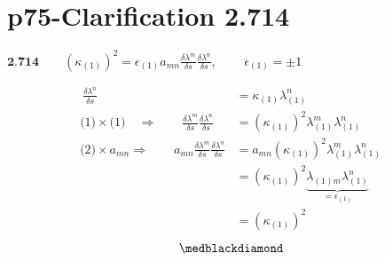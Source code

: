 \section{p75-Clarification 2.714}
\begin{tcolorbox}
$\textbf{2.714} \quad \quad (\kappa_{(1)})^2 = \epsilon_{(1)} a_{mn} \frac{\delta \lambda^{m}}{\delta s} \frac{\delta \lambda^{n}}{\delta s}$,   $\quad \quad \epsilon_{(1)} = \pm 1$
\end{tcolorbox}
\begin{align}
\ \frac{\delta \lambda^{n}}{\delta s} &= \kappa_{(1)}\lambda_{(1)}^{n}\\
\text{(1)}\times \text{(1)}\quad\Rightarrow \quad\quad \frac{\delta \lambda^{m}}{\delta s}\frac{\delta \lambda^{n}}{\delta s} &= (\kappa_{(1)})^2 \lambda_{(1)}^{m}\lambda_{(1)}^{n}\\
\text{(2)}\times a_{mn} \Rightarrow\quad\quad a_{mn}\frac{\delta \lambda^{m}}{\delta s}\frac{\delta \lambda^{n}}{\delta s} &= a_{mn}(\kappa_{(1)})^2 \lambda_{(1)}^{m}\lambda_{(1)}^{n}\\
\ &= (\kappa_{(1)})^2 \underbrace{\lambda_{(1)m} \lambda_{(1)}^{n}}_{=\epsilon_{(1)}}\\
\ &= (\kappa_{(1)})^2 
\end{align}
$$\medblackdiamond$$
\newpage


